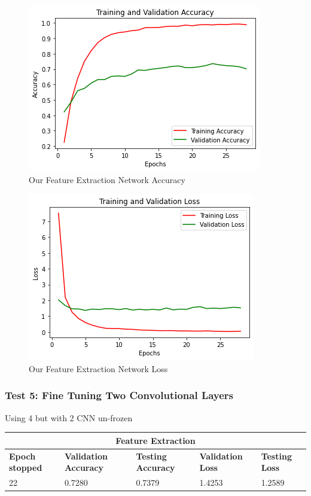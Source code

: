 \medskip

\begin{figure}[H]
	\centering
	\includegraphics[height=0.45\textwidth]{img/vgg16ft1dropacc.png}
	\caption{Our Feature Extraction Network Accuracy}
	\label{fig:vgg16ft1dropacc}
\end{figure}

\begin{figure}[H]
	\centering
	\includegraphics[height=0.45\textwidth]{img/vgg16ft1droploss.png}
	\caption{Our Feature Extraction Network Loss}
	\label{fig:vgg16ft1droploss}
\end{figure}





\subsubsection{Test 5: Fine Tuning Two Convolutional Layers}
Using 4 but with 2 CNN un-frozen

 \medskip

\begin{tabular}{ |p{2cm}|p{2cm}|p{2cm}|p{2cm}|p{2cm}|  }
\hline
\multicolumn{5}{|c|}{Feature Extraction} \\
\hline
\textbf{Epoch stopped} & \textbf{Validation Accuracy} & \textbf{Testing Accuracy} & \textbf{Validation Loss} & \textbf{Testing Loss} \\
\hline
22 & 0.7280 & 0.7379 & 1.4253 & 1.2589\\
\hline
\end{tabular}

